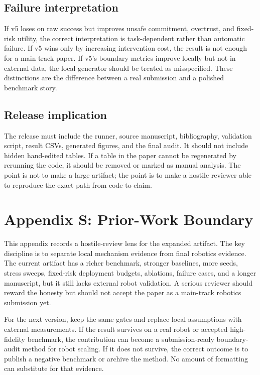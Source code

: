 \documentclass{article}
\begin{document}
\subsection{Failure interpretation}
If v5 loses on raw success but improves unsafe commitment, overtrust, and fixed-risk utility, the correct interpretation is task-dependent rather than automatic failure. If v5 wins only by increasing intervention cost, the result is not enough for a main-track paper. If v5's boundary metrics improve locally but not in external data, the local generator should be treated as misspecified. These distinctions are the difference between a real submission and a polished benchmark story.

\subsection{Release implication}
The release must include the runner, source manuscript, bibliography, validation script, result CSVs, generated figures, and the final audit. It should not include hidden hand-edited tables. If a table in the paper cannot be regenerated by rerunning the code, it should be removed or marked as manual analysis. The point is not to make a large artifact; the point is to make a hostile reviewer able to reproduce the exact path from code to claim.


\section{Appendix S: Prior-Work Boundary}
This appendix records a hostile-review lens for the expanded artifact. The key discipline is to separate local mechanism evidence from final robotics evidence. The current artifact has a richer benchmark, stronger baselines, more seeds, stress sweeps, fixed-risk deployment budgets, ablations, failure cases, and a longer manuscript, but it still lacks external robot validation. A serious reviewer should reward the honesty but should not accept the paper as a main-track robotics submission yet.

For the next version, keep the same gates and replace local assumptions with external measurements. If the result survives on a real robot or accepted high-fidelity benchmark, the contribution can become a submission-ready boundary-audit method for robot scaling. If it does not survive, the correct outcome is to publish a negative benchmark or archive the method. No amount of formatting can substitute for that evidence.
\end{document}
